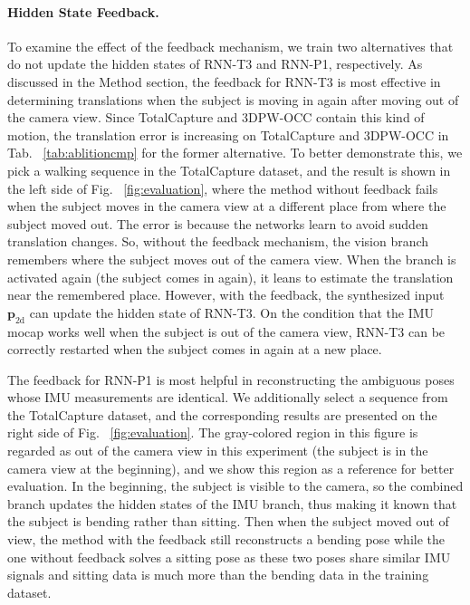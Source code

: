 \paragraph{Hidden State Feedback.}
%
To examine the effect of the feedback mechanism, we train two alternatives that do not update the hidden states of RNN-T3 and RNN-P1, respectively.
%
As discussed in the Method section, the feedback for RNN-T3 is most effective in determining translations when the subject is moving in again after moving out of the camera view.
%
Since TotalCapture and 3DPW-OCC contain this kind of motion, the translation error is increasing on TotalCapture and 3DPW-OCC in Tab. ~\ref{tab:ablitioncmp} for the former alternative.
%
To better demonstrate this, we pick a walking sequence in the TotalCapture dataset, and the result is shown in the left side of Fig. ~\ref{fig:evaluation}, where the method without feedback fails when the subject moves in the camera view at a different place from where the subject moved out.
%
The error is because the networks learn to avoid sudden translation changes.
%
So, without the feedback mechanism, the vision branch remembers where the subject moves out of the camera view. When the branch is activated again (the subject comes in again), it leans to estimate the translation near the remembered place.
%
However, with the feedback, the synthesized input $\boldsymbol{p}_{\mathrm{2d}}$ can update the hidden state of RNN-T3. On the condition that the IMU mocap works well when the subject is out of the camera view, RNN-T3 can be correctly restarted when the subject comes in again at a new place. 
%
\par
%
The feedback for RNN-P1 is most helpful in reconstructing the ambiguous poses whose IMU measurements are identical.
%
We additionally select a sequence from the TotalCapture dataset, and the corresponding results are presented on the right side of Fig. ~\ref{fig:evaluation}.
%
The gray-colored region in this figure is regarded as out of the camera view in this experiment (the subject is in the camera view at the beginning), and we show this region as a reference for better evaluation.
%
In the beginning, the subject is visible to the camera, so the combined branch updates the hidden states of the IMU branch, thus making it known that the subject is bending rather than sitting.
%
Then when the subject moved out of view, the method with the feedback still reconstructs a bending pose while the one without feedback solves a sitting pose as these two poses share similar IMU signals and sitting data is much more than the bending data in the training dataset.
%
%
